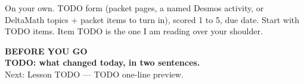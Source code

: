 \documentclass[aspectratio=169, 11pt]{beamer}
\begin{document}
\begin{frame}[t, plain]
  \begin{block}{On your own. TODO form (packet pages, a named Desmos activity, or DeltaMath topics + packet items to turn in), scored 1 to 5, due date.}
    Start with TODO items. Item TODO is the one I am reading over your shoulder.
  \end{block}
\end{frame}

{
\begin{frame}[plain]
  \vspace{1.5cm}\hspace{0.8cm}%
  \begin{minipage}{0.86\textwidth}
    {\color{goldacc}\bfseries\small BEFORE YOU GO}\\[0.7cm]
    {\color{white}\bfseries\Large TODO: what changed today, in two sentences.}\\[0.9cm]
    {\color{frostmid}\small Next: Lesson TODO --- TODO one-line preview.}
  \end{minipage}
\end{frame}
}
\end{document}
